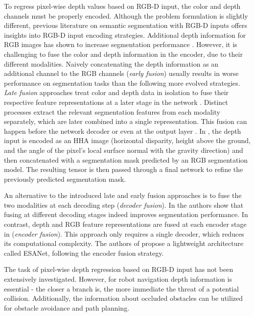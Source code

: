 To regress pixel-wise depth values based on RGB-D input, the color and depth channels must be properly encoded. Although the problem formulation is slightly different, previous literature on semantic segmentation with RGB-D inputs offers insights into RGB-D input encoding strategies.
Additional depth information for RGB images has shown to increase segmentation performance \cite{Depth-awareCNN}. However, it is challenging to fuse the color and depth information in the encoder, due to their different modalities. Naively concatenating the depth information as an additional channel to the RGB channels (\textit{early fusion}) usually results in worse performance on segmentation tasks \cite{wang2021dl_rgb_seg_review} than the following more evolved strategies.
%
\textit{Late fusion} approaches treat color and depth data in isolation to fuse their respective feature representations at a later stage in the network \cite{xing2019coupling}. Distinct processes extract the relevant segmentation features from each modality separately, which are later combined into a single representation. This fusion can happen before the network decoder \cite{jiang2018rednet} or even at the output layer \cite{TejaswiDigumarti2019}. In \cite{gupta2014HHA_encoding}, the depth input is encoded as an HHA image (horizontal disparity, height above the ground, and the angle of the pixel’s local surface normal with the gravity direction) and then concatenated with a segmentation mask predicted by an RGB segmentation model. The resulting tensor is then passed through a final network to refine the previously predicted segmentation mask.

An alternative to the introduced late and early fusion approaches is to fuse the two modalities at each decoding step (\textit{decoder fusion}). In \cite{Depth-awareCNN} the authors show that fusing at different decoding stages indeed improves segmentation performance. In contrast, depth and RGB feature representations are fused at each encoder stage in \cite{Seichter2020ESANet, jiang2018rednet} (\textit{encoder fusion}). This approach only requires a single decoder, which reduces its computational complexity. The authors of \cite{Seichter2020ESANet} propose a lightweight architecture called ESANet, following the encoder fusion strategy.


The task of pixel-wise depth regression based on RGB-D input has not been extensively investigated. However, for robot navigation depth information is essential - the closer a branch is, the more immediate the threat of a potential collision. Additionally, the information about occluded obstacles can be utilized for obstacle avoidance and path planning. 

